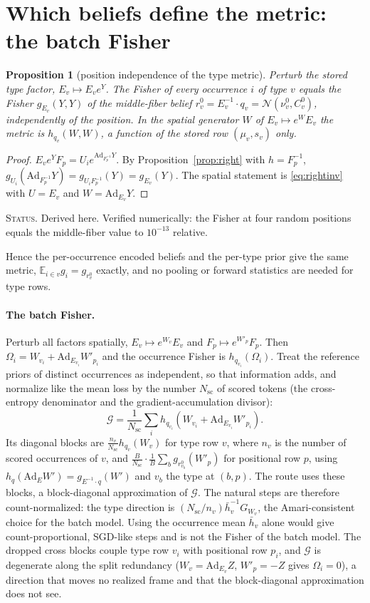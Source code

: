 \documentclass[11pt]{article}
\newtheorem{proposition}[theorem]{Proposition}
\theoremstyle{definition}
\theoremstyle{remark}
\newcommand{\Ad}{\mathrm{Ad}}
\newcommand{\Normal}{\mathcal{N}}
\newcommand{\Nsc}{N_{\mathrm{sc}}}
\newcommand{\status}[1]{\par\smallskip\noindent\textsc{Status.} #1\par\smallskip}
\begin{document}
\section{Which beliefs define the metric: the batch Fisher}\label{sec:batch}

\begin{proposition}[position independence of the type metric]\label{prop:position}
Perturb the stored type factor, $E_v\mapsto E_ve^{Y}$. The Fisher of every occurrence $i$ of type $v$ equals the Fisher $g_{E_v}(Y,Y)$ of the middle-fiber belief $r_v^0=E_v^{-1}\cdot q_v=\Normal(\nu^0_v,C^0_v)$, independently of the position. In the spatial generator $W$ of $E_v\mapsto e^{W}E_v$ the metric is $h_{q_v}(W,W)$, a function of the stored row $(\mu_v,s_v)$ only.
\end{proposition}
\begin{proof}
$E_ve^YF_p=U_ie^{\Ad_{F_p^{-1}}Y}$. By Proposition~\ref{prop:right} with $h=F_p^{-1}$, $g_{U_i}(\Ad_{F_p^{-1}}Y)=g_{U_iF_p^{-1}}(Y)=g_{E_v}(Y)$. The spatial statement is \eqref{eq:rightinv} with $U=E_v$ and $W=\Ad_{E_v}Y$.
\end{proof}
\status{Derived here. Verified numerically: the Fisher at four random positions equals the middle-fiber value to $10^{-13}$ relative.}

Hence the per-occurrence encoded beliefs and the per-type prior give the same metric, $\mathbb{E}_{i\in v}g_i=g_{r^0_v}$ exactly, and no pooling or forward statistics are needed for type rows.

\paragraph{The batch Fisher.} Perturb all factors spatially, $E_v\mapsto e^{W_v}E_v$ and $F_p\mapsto e^{W'_p}F_p$. Then $\Omega_i=W_{v_i}+\Ad_{E_{v_i}}W'_{p_i}$ and the occurrence Fisher is $h_{q_{v_i}}(\Omega_i)$. Treat the reference priors of distinct occurrences as independent, so that information adds, and normalize like the mean loss by the number $\Nsc$ of scored tokens (the cross-entropy denominator and the gradient-accumulation divisor):
\begin{equation}\label{eq:batch}
\mathcal{G}=\frac{1}{\Nsc}\sum_ih_{q_{v_i}}\left(W_{v_i}+\Ad_{E_{v_i}}W'_{p_i}\right).
\end{equation}
Its diagonal blocks are $\frac{n_v}{\Nsc}h_{q_v}(W_v)$ for type row $v$, where $n_v$ is the number of scored occurrences of $v$, and $\frac{B}{\Nsc}\cdot\frac1B\sum_bg_{r^0_{v_b}}(W'_p)$ for positional row $p$, using $h_q(\Ad_EW')=g_{E^{-1}\cdot q}(W')$ and $v_b$ the type at $(b,p)$. The route uses these blocks, a block-diagonal approximation of $\mathcal{G}$. The natural steps are therefore count-normalized: the type direction is $(\Nsc/n_v)\bar h_v^{-1}G_{W_v}$, the Amari-consistent choice for the batch model. Using the occurrence mean $\bar h_v$ alone would give count-proportional, SGD-like steps and is not the Fisher of the batch model. The dropped cross blocks couple type row $v_i$ with positional row $p_i$, and $\mathcal{G}$ is degenerate along the split redundancy ($W_v=\Ad_{E_v}Z$, $W'_p=-Z$ gives $\Omega_i=0$), a direction that moves no realized frame and that the block-diagonal approximation does not see.
\end{document}
